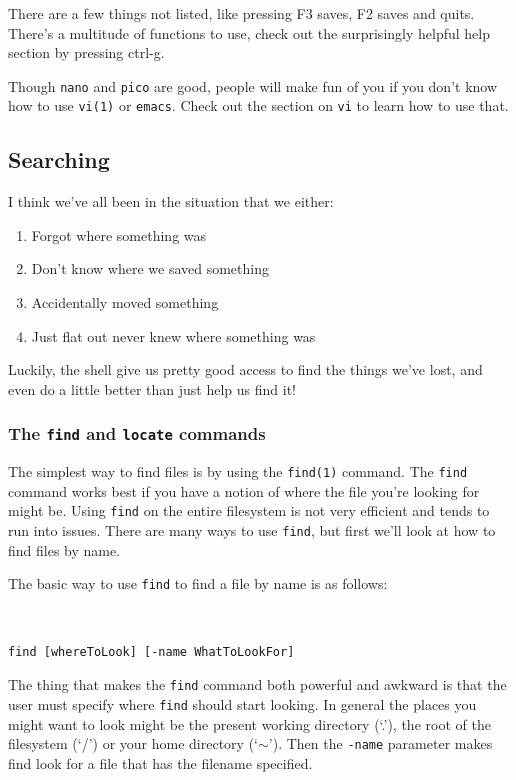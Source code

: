 There are a few things not listed, like pressing F3 saves, F2 saves and quits. 
There's a multitude of functions to use, check out the surprisingly helpful
help section by pressing ctrl-g.

Though {\tt nano} and {\tt pico} are good, people will make fun of you 
if you don't know how to use {\tt vi(1)} or {\tt emacs}.  Check out the section
on {\tt vi} to learn how to use that.

 
 


\subsection{Searching}
I think we've all been in the situation that we either:
\begin{enumerate}
\item Forgot where something was
\item Don't know where we saved something
\item Accidentally moved something
\item Just flat out never knew where something was
\end{enumerate}

Luckily, the shell give us pretty good access to find the things we've lost, and even do a little better than just help us find it!

\subsubsection{The {\tt find} and {\tt locate} commands}
The simplest way to find files is by using the {\tt find(1)} command.  The {\tt find} 
command works best if you have a notion of where the file you're looking for might be. 
Using {\tt find} on the entire filesystem is not very efficient and tends to run into issues. 
There are many ways to use {\tt find}, but first we'll look at how to find files by name.

The basic way to use {\tt find} to find a file by name is as follows:
{\tt
\begin{verbatim}
find [whereToLook] [-name WhatToLookFor]
\end{verbatim}
}
The thing that makes the {\tt find} command both powerful and awkward
is that the user must specify where {\tt find} should start looking. In general
the places you might want to look might be the present working directory (`.'), the 
root of the filesystem (`/') or your home directory (`$\sim$'). Then the {\tt -name} 
parameter makes find look for a file that has the filename specified. 
 

